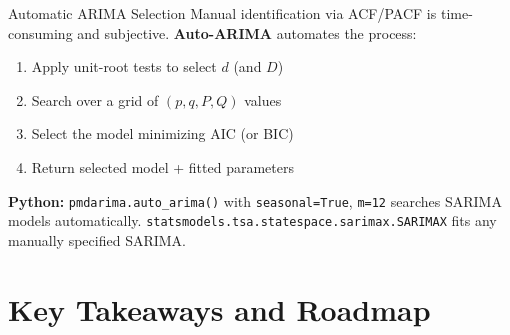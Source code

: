 \documentclass[aspectratio=169, 11pt]{beamer}
\begin{document}
\begin{frame}{Automatic ARIMA Selection}
  Manual identification via ACF/PACF is time-consuming and subjective.
  \textbf{Auto-ARIMA} automates the process:
  \begin{enumerate}\small
    \item Apply unit-root tests to select $d$ (and $D$)
    \item Search over a grid of $(p,q,P,Q)$ values
    \item Select the model minimizing AIC (or BIC)
    \item Return selected model + fitted parameters
  \end{enumerate}
  \begin{keybox}
    \textbf{Python:} \texttt{pmdarima.auto\_arima()} with
    \texttt{seasonal=True}, \texttt{m=12} searches SARIMA models
    automatically. \texttt{statsmodels.tsa.statespace.sarimax.SARIMAX}
    fits any manually specified SARIMA.
  \end{keybox}
\end{frame}

\section{Key Takeaways and Roadmap}

\end{document}
